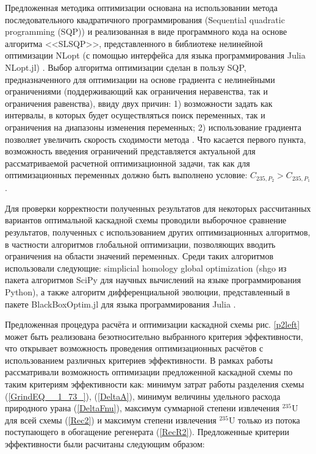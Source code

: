 Предложенная методика оптимизации основана на использовании метода последовательного квадратичного программирования (Sequential quadratic programming (SQP)) и реализованная в виде программного кода на основе алгоритма <<SLSQP>>, представленного в библиотеке нелинейной оптимизации NLopt (с помощью интерфейса для языка программирования Julia NLopt.jl) \cite{NLopt}. Выбор алгоритма оптимизации сделан в пользу SQP, предназначенного для оптимизации на основе градиента с нелинейными ограничениями (поддерживающий как ограничения неравенства, так и ограничения равенства), ввиду двух причин: 1) возможности задать как интервалы, в которых будет осуществляться поиск переменных, так и ограничения на диапазоны изменения переменных; 2) использование градиента позволяет увеличить скорость сходимости метода \cite{NumericalOptimization2006}. Что касается первого пункта, возможность введения ограничений представляется актуальной для рассматриваемой расчетной оптимизационной задачи, так как для оптимизационных переменных должно быть выполнено условие: ${C_{235,{P_2}}}>{C_{235,{P_1}}}$. 

Для проверки корректности полученных результатов для некоторых рассчитанных вариантов оптимальной каскадной схемы проводили выборочное сравнение результатов, полученных с использованием других оптимизационных алгоритмов, в частности алгоритмов глобальной оптимизации, позволяющих вводить ограничения на области значений переменных. Среди таких алгоритмов использовали следующие: simplicial homology global optimization (shgo из пакета алгоритмов SciPy для научных вычислений на языке программирования Python), а также алгоритм дифференциальной эволюции, представленный в пакете BlackBoxOptim.jl для языка программирования Julia \cite{пантелеевМетаэвристическиеАлгоритмыПоиска2009,virtanenSciPyFundamentalAlgorithms2020,endresSimplicialHomologyAlgorithm2018,mogensenOptimMathematicalOptimization2018,storn1997differential,Price-et-al-differential-evolution-2005,Feldt2018}.

Предложенная процедура расчёта и оптимизации каскадной схемы рис. \ref{p2left} может быть реализована безотносительно выбранного критерия эффективности, что открывает возможность проведения оптимизационных расчётов с использованием различных критериев эффективности. В рамках работы рассматривали возможность оптимизации предложенной каскадной схемы по таким критериям эффективности как: минимум затрат работы разделения схемы (\ref{GrindEQ__1_73_}), (\ref{DeltaA}), минимум величины удельного расхода природного урана (\ref{DeltaFnu}), максимум суммарной степени извлечения $^{235}$U для всей схемы (\ref{Rec2}) и максимум степени извлечения $^{235}$U только из потока поступающего в обогащение регенерата (\ref{RecR2}). Предложенные критерии эффективности были расчитаны следующим образом:

